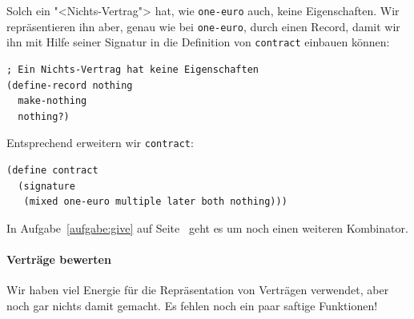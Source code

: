 Solch ein "<Nichts-Vertrag"> hat, wie \lstinline{one-euro} auch, keine
Eigenschaften.  Wir repräsentieren ihn aber, genau wie bei
\lstinline{one-euro}, durch einen Record, damit wir ihn mit Hilfe
seiner Signatur in die Definition von \lstinline{contract} einbauen
können:
%
\begin{lstlisting}
; Ein Nichts-Vertrag hat keine Eigenschaften
(define-record nothing
  make-nothing
  nothing?)
\end{lstlisting}
%
Entsprechend erweitern wir \lstinline{contract}:
%
\begin{lstlisting}
(define contract
  (signature
   (mixed one-euro multiple later both nothing)))
\end{lstlisting}
%
In Aufgabe~\ref{aufgabe:give} auf Seite~\pageref{aufgabe:give} geht es
um noch einen weiteren Kombinator.

\paragraph{Verträge bewerten}

Wir haben viel Energie für die Repräsentation von Verträgen verwendet,
aber noch gar nichts damit gemacht.  Es fehlen noch ein paar saftige
Funktionen!

